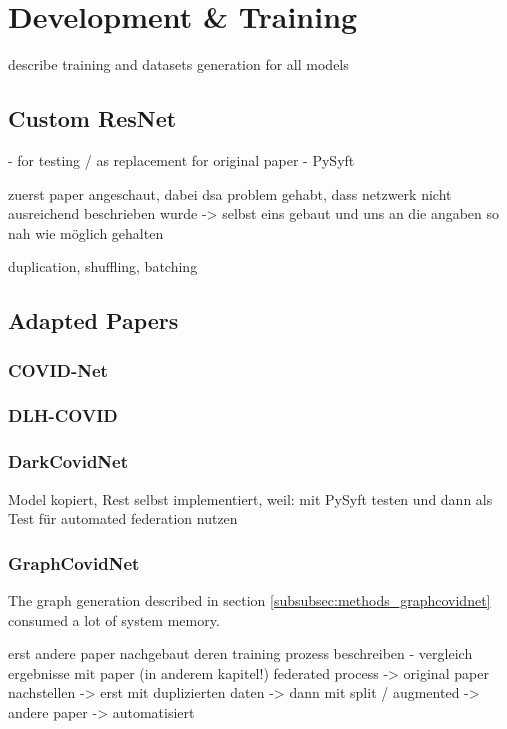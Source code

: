 \section{Development \& Training}\label{sec:dev_and_training}
describe training and datasets generation for all models


\subsection{Custom ResNet}
- for testing / as replacement for original paper
- PySyft

zuerst paper angeschaut, dabei dsa problem gehabt, dass netzwerk nicht ausreichend beschrieben wurde
-> selbst eins gebaut und uns an die angaben so nah wie möglich gehalten

duplication, shuffling, batching

\subsection{Adapted Papers}

\subsubsection{COVID-Net}\label{subsubsec:dev_covidnet}

\subsubsection{DLH-COVID}
\subsubsection{DarkCovidNet}
Model kopiert, Rest selbst implementiert, weil: mit PySyft testen und dann als Test für automated federation nutzen
\subsubsection{GraphCovidNet}


The graph generation described in section \ref{subsubsec:methods_graphcovidnet} consumed a lot of system memory. 

erst andere paper nachgebaut
deren training prozess beschreiben - vergleich ergebnisse mit paper (in anderem kapitel!)
federated process 
  -> original paper nachstellen
  -> erst mit duplizierten daten
  -> dann mit split / augmented
  -> andere paper
  -> automatisiert


